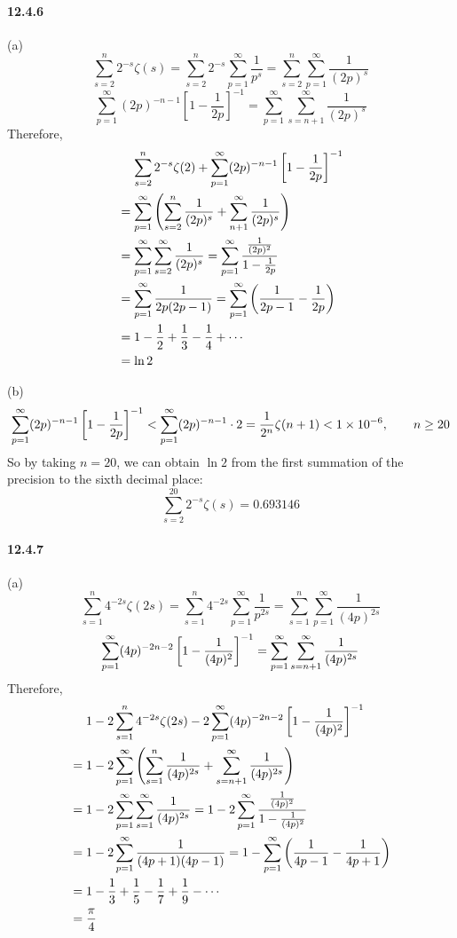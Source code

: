 \documentclass[a4paper]{article}
\begin{document}
\paragraph{12.4.6}
(a)
\[
\sum_{s=2}^n 2^{-s}\zeta(s)=\sum_{s=2}^n 2^{-s}\sum_{p=1}^\infty\frac{1}{p^s}=\sum_{s=2}^n\sum_{p=1}^\infty\frac{1}{(2p)^s}
\]
\[
\sum_{p=1}^\infty(2p)^{-n-1}\left[1-\frac{1}{2p} \right]^{-1}=\sum_{p=1}^\infty\sum_{s=n+1}^\infty\frac{1}{(2p)^s}
\]
Therefore,
\begin{equation*}
    \begin{split}
         & \quad\,\sum_{s=2}^n 2^{-s}\zeta(2)+\sum_{p=1}^\infty(2p)^{-n-1}\left[1-\frac{1}{2p} \right]^{-1}\\
        & =  \sum_{p=1}^\infty\left(\sum_{s=2}^n\frac{1}{(2p)^s}+\sum_{n+1}^\infty\frac{1}{(2p)^s} \right)\\
        & =  \sum_{p=1}^\infty\sum_{s=2}^\infty\frac{1}{(2p)^s}=\sum_{p=1}^\infty\frac{\frac{1}{(2p)^2}}{1-\frac{1}{2p}}\\
        & =  \sum_{p=1}^\infty\frac{1}{2p(2p-1)}=\sum_{p=1}^\infty\left(\frac{1}{2p-1}-\frac{1}{2p} \right)\\
        & =  1-\frac{1}{2}+\frac{1}{3}-\frac{1}{4}+\cdots\\
        & =  \ln 2
    \end{split}
\end{equation*}

(b)
\[
\sum_{p=1}^\infty(2p)^{-n-1}\left[1-\frac{1}{2p} \right]^{-1}<\sum_{p=1}^\infty(2p)^{-n-1}\cdot2=\frac{1}{2^n}\zeta(n+1)<1\times10^{-6},\qquad n\geq20
\]
So by taking $n=20$, we can obtain $\ln 2$ from the first summation of the precision to the sixth decimal place:
\[
\sum_{s=2}^{20}2^{-s}\zeta(s)=0.693146
\]

\paragraph{12.4.7}
(a)
\[
\sum_{s=1}^n 4^{-2s}\zeta(2s)=\sum_{s=1}^n 4^{-2s}\sum_{p=1}^\infty\frac{1}{p^{2s}}=\sum_{s=1}^n\sum_{p=1}^\infty\frac{1}{(4p)^{2s}}
\]
\[
\sum_{p=1}^\infty(4p)^{-2n-2}\left[1-\frac{1}{(4p)^2}\right]^{-1}=\sum_{p=1}^\infty\sum_{s=n+1}^\infty\frac{1}{(4p)^{2s}}
\]
Therefore, 
\begin{equation*}
    \begin{split}
        & \quad\,\, 1-2\sum_{s=1}^n 4^{-2s}\zeta(2s)-2\sum_{p=1}^\infty(4p)^{-2n-2}\left[1-\frac{1}{(4p)^2} \right]^{-1}\\
        & =1-2\sum_{p=1}^\infty\left(\sum_{s=1}^n\frac{1}{(4p)^{2s}}+\sum_{s=n+1}^\infty\frac{1}{(4p)^{2s}} \right)\\
        & =1-2\sum_{p=1}^\infty\sum_{s=1}^\infty\frac{1}{(4p)^{2s}}=1-2\sum_{p=1}^\infty\frac{\frac{1}{(4p)^2}}{1-\frac{1}{(4p)^2}}\\
        & =1-2\sum_{p=1}^\infty\frac{1}{(4p+1)(4p-1)}=1-\sum_{p=1}^\infty\left(\frac{1}{4p-1}-\frac{1}{4p+1} \right)\\
        & =1-\frac{1}{3}+\frac{1}{5}-\frac{1}{7}+\frac{1}{9}-\cdots\\
        & =\frac{\pi}{4}
    \end{split}
\end{equation*}
\end{document}
